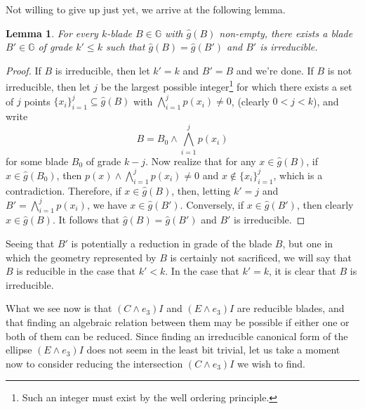 \documentclass{birkjour}
\newtheorem{lem}[thm]{Lemma}
\theoremstyle{definition}
\theoremstyle{remark}
\numberwithin{equation}{section}
\newcommand{\G}{\mathbb{G}}
\newcommand{\gh}{\hat{g}}
\begin{document}
Not willing to give up just yet, we arrive at the following lemma.

\begin{lem}\label{lma_irreducible_form_exists}
For every $k$-blade $B\in\G$ with $\gh(B)$ non-empty, there exists a blade $B'\in\G$ of grade $k'\leq k$
such that $\gh(B)=\gh(B')$ and $B'$ is irreducible.
\end{lem}
\begin{proof}
If $B$ is irreducible, then let $k'=k$ and $B'=B$ and we're done.
If $B$ is not irreducible, then let $j$ be the largest possible integer\footnote{Such an
integer must exist by the well ordering principle.}
for which there exists a set of $j$ points $\{x_i\}_{i=1}^j\subseteq\gh(B)$
with $\bigwedge_{i=1}^j p(x_i)\neq 0$, (clearly $0<j<k$), and write
\begin{equation*}
B = B_0\wedge\bigwedge_{i=1}^j p(x_i)
\end{equation*}
for some blade $B_0$ of grade $k-j$.  Now realize that for any $x\in\gh(B)$,
if $x\in\gh(B_0)$, then $p(x)\wedge\bigwedge_{i=1}^j p(x_i)\neq 0$ and $x\not\in\{x_i\}_{i=1}^j$,
which is a contradiction.  Therefore, if $x\in\gh(B)$, then, letting $k'=j$ and $B'=\bigwedge_{i=1}^jp(x_i)$,
we have $x\in\gh(B')$.  Conversely, if $x\in\gh(B')$, then clearly $x\in\gh(B)$.  It follows that
$\gh(B)=\gh(B')$ and $B'$ is irreducible.
\end{proof}

Seeing that $B'$ is potentially a reduction in grade of the blade $B$, but one
in which the geometry represented by $B$ is certainly not sacrificed,
we will say that $B$ is reducible
in the case that $k'<k$.  In the case that $k'=k$, it is clear that $B$ is irreducible.

What we see now is that $(C\wedge e_3)I$ and $(E\wedge e_3)I$ are reducible blades,
and that finding an algebraic relation between them may be possible if either
one or both of them can be reduced.  Since finding an
irreducible canonical form of the ellipse $(E\wedge e_3)I$
does not seem in the least bit trivial, let us take a moment now to consider reducing the
intersection $(C\wedge e_3)I$ we wish to find.
\end{document}
